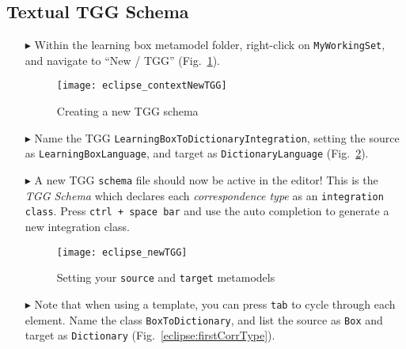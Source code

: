 \newpage
\hypertarget{schema tex}{}
\subsection{Textual TGG Schema}
\texHeader

\begin{itemize}

\item[$\blacktriangleright$] Within the learning box metamodel folder, right-click on \texttt{MyWorkingSet}, and navigate to ``New / TGG''
(Fig.~\ref{eclipse:contextTGG}).

\vspace{0.5cm}

\begin{figure}[htbp]
\begin{center}
  \texttt{[image: eclipse\_contextNewTGG]}
  \caption{Creating a new TGG schema}
  \label{eclipse:contextTGG}
\end{center}
\end{figure}

\item[$\blacktriangleright$] Name the TGG \texttt{LearningBoxToDictionaryIntegration}, setting the source as \texttt{LearningBoxLanguage}, and target as
\texttt{DictionaryLanguage} (Fig.~\ref{eclipse:newTGG}).

\item[$\blacktriangleright$] A new TGG \texttt{schema} file should now be active in the editor! This is the \emph{TGG Schema} which declares each
\emph{correspondence type} as an \texttt{integration class}. Press \texttt{ctrl + space bar} and use the auto completion to generate a new integration class.

\newpage

\begin{figure}[htbp]
\begin{center}
  \texttt{[image: eclipse\_newTGG]}
  \caption{Setting your \texttt{source} and \texttt{target} metamodels}
  \label{eclipse:newTGG}
\end{center}
\end{figure}

\item[$\blacktriangleright$] Note that when using a template, you can press \texttt{tab} to cycle through each element. Name the class
\texttt{BoxToDictionary}, and list the source as \texttt{Box} and target as \texttt{Dictionary} (Fig.~\ref{eclipse:firstCorrType}). 


\end{itemize}
